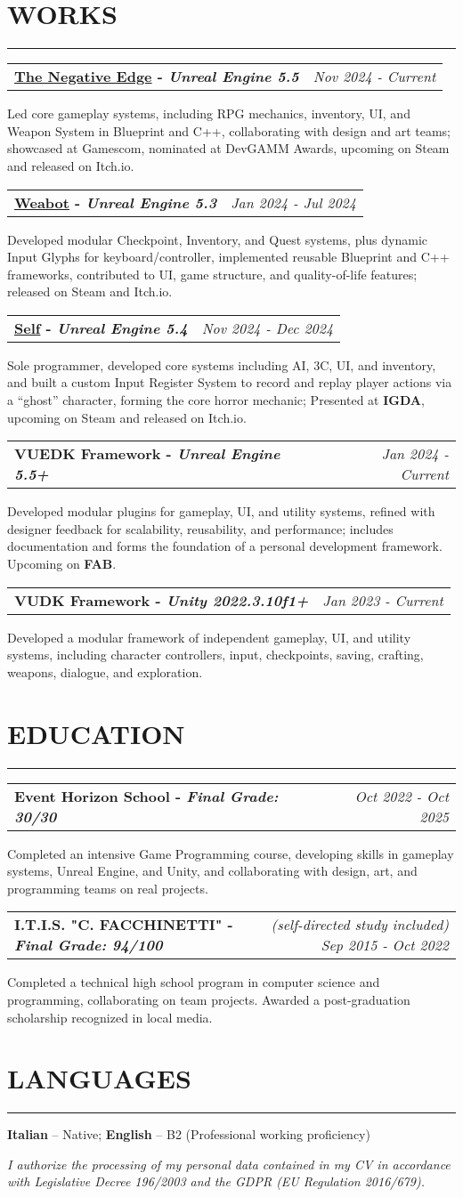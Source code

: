 \documentclass[7pt]{article}
\makeatletter
\newcommand{\sectionline}{\vspace{-0.3em}\noindent\rule{\linewidth}{0.15pt}\vspace{0.08em}}
\newcommand{\project}[3]{%
    \noindent
    \begin{tabular*}{\textwidth}{@{\extracolsep{\fill}} l r}
    \textbf{#1} & \textit{#2} \\
    \end{tabular*}
    \vspace{0.04em}
    #3
    \vspace{0.08em}\par
}
\newcommand{\cvsection}[2]{%
    \section*{{\large\textbf{\MakeUppercase{#1}}}}
    \vspace{-0.5em}
    \sectionline
    \vspace{-0.15em}
    #2
}
\newcommand{\footerdescription}[1]{%
    \begin{center}
    \vspace{0.1em}
    \scriptsize
    \textit{#1}
    \end{center}
}
\makeatother
\begin{document}
    \cvsection{WORKS}{
        \project{\href{https://eventhorizonschool.itch.io/the-negative-edge}{The Negative Edge} - \textit{Unreal Engine 5.5}}{Nov 2024 - Current}{
            Led core gameplay systems, including RPG mechanics, inventory, UI, and Weapon System in Blueprint and C++, collaborating with design and art teams;
            showcased at Gamescom, nominated at DevGAMM Awards, upcoming on Steam and released on Itch.io.
        }
        \project{\href{https://store.steampowered.com/app/4075260/Weabot/}{Weabot} - \textit{Unreal Engine 5.3}}{Jan 2024 - Jul 2024}{
            Developed modular Checkpoint, Inventory, and Quest systems, plus dynamic Input Glyphs for keyboard/controller, implemented reusable Blueprint and C++ frameworks, contributed to UI, game structure, and quality-of-life features;
            released on Steam and Itch.io.
        }
        \project{\href{https://jacedxxm.itch.io/self}{Self} - \textit{Unreal Engine 5.4}}{Nov 2024 - Dec 2024}{
            Sole programmer, developed core systems including AI, 3C, UI, and inventory, and built a custom Input Register System to record and replay player actions via a “ghost” character,
            forming the core horror mechanic; Presented at \textbf{IGDA}, upcoming on Steam and released on Itch.io.
        }
        \project{VUEDK Framework - \textit{Unreal Engine 5.5+}}{Jan 2024 - Current}{
            Developed modular plugins for gameplay, UI, and utility systems, refined with designer feedback for scalability, reusability, and performance;
            includes documentation and forms the foundation of a personal development framework. Upcoming on \textbf{FAB}.
        }
        \project{VUDK Framework - \textit{Unity 2022.3.10f1+}}{Jan 2023 - Current}{
            Developed a modular framework of independent gameplay, UI, and utility systems, including character controllers, input, checkpoints, saving, crafting, weapons, dialogue, and exploration.
        }
    }

    \cvsection{EDUCATION}{
        \project{Event Horizon School - \textit{Final Grade: 30/30}}{Oct 2022 - Oct 2025}{
            Completed an intensive Game Programming course, developing skills in gameplay systems, Unreal Engine, and Unity, and collaborating with design, art, and programming teams on real projects.
        }
        \project{I.T.I.S. "C. FACCHINETTI" - \textit{Final Grade: 94/100}}{ (self-directed study included) Sep 2015 - Oct 2022}{
            Completed a technical high school program in computer science and programming, collaborating on team projects.
            Awarded a post-graduation scholarship recognized in local media.
        }
    }

    \cvsection{LANGUAGES}{
        \textbf{Italian} – Native; \textbf{English} – B2 (Professional working proficiency)
    }

    \footerdescription{
        I authorize the processing of my personal data contained in my CV in accordance with Legislative Decree 196/2003 and the GDPR (EU Regulation 2016/679).
    }
\end{document}
